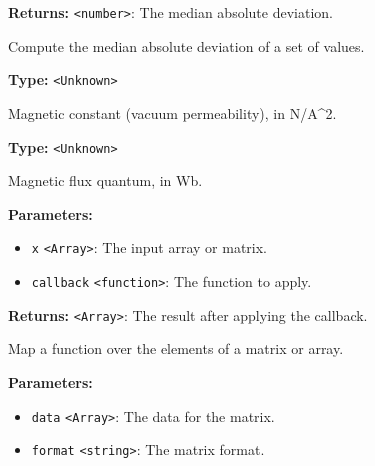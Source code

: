 \documentclass[12pt,a4paper]{article}
\begin{document}
\noindent \textbf{Returns:} \texttt{<number>}: The median absolute deviation.

\noindent Compute the median absolute deviation of a set of values.

\vspace{5mm}
\noindent {}\vspace{4mm}


\noindent \textbf{Type:} \texttt{<Unknown>}

\noindent Magnetic constant (vacuum permeability), in N/A\textasciicircum{}2.

\vspace{5mm}
\noindent {}\vspace{4mm}


\noindent \textbf{Type:} \texttt{<Unknown>}

\noindent Magnetic flux quantum, in Wb.

\vspace{5mm}
\noindent {}


\noindent \textbf{Parameters:}
\begin{itemize}
  \item \texttt{x} \texttt{<Array>}: The input array or matrix.
  \item \texttt{callback} \texttt{<function>}: The function to apply.
\end{itemize}

\noindent \textbf{Returns:} \texttt{<Array>}: The result after applying the callback.

\noindent Map a function over the elements of a matrix or array.

\vspace{5mm}
\noindent {}


\noindent \textbf{Parameters:}
\begin{itemize}
  \item \texttt{data} \texttt{<Array>}: The data for the matrix.
  \item \texttt{format} \texttt{<string>}: The matrix format.
\end{itemize}
\end{document}
